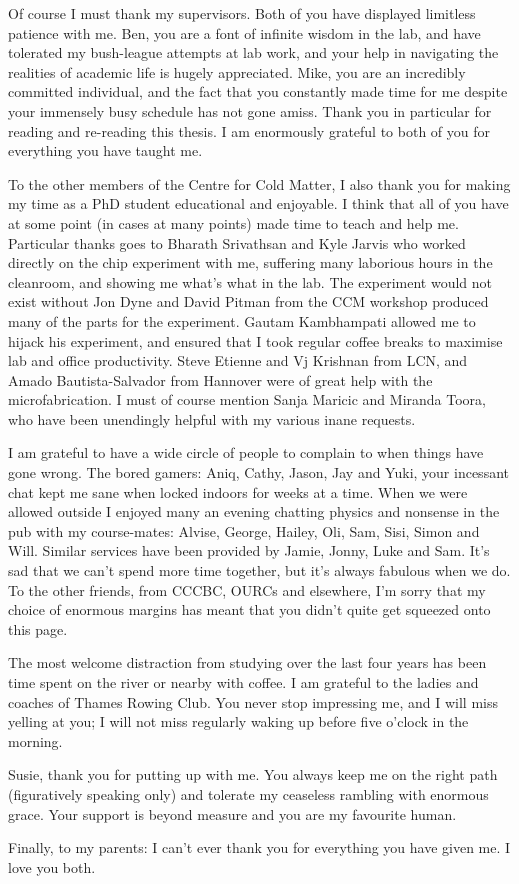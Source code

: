\begin{singlespace}
Of course I must thank my supervisors. Both of you have displayed limitless
patience with me. Ben, you are a font of infinite wisdom in the lab, and have
tolerated my bush-league attempts at lab work, and your help in navigating the
realities of academic life is hugely appreciated. Mike, you are an incredibly
committed individual, and the fact that you constantly made time for me despite
your immensely busy schedule has not gone amiss. Thank you in particular for
reading and re-reading this thesis.  I am enormously grateful to both of you
for everything you have taught me.

To the other members of the Centre for Cold Matter, I also thank you for making
my time as a PhD student educational and enjoyable. I think that all of you
have at some point (in cases at many points) made time to teach and
help me.
%
Particular thanks goes to Bharath Srivathsan and Kyle Jarvis who worked
directly on the chip experiment with me, suffering many laborious hours in the
cleanroom, and showing me what's what in the lab.
%
The experiment would not exist without Jon Dyne and David Pitman from the CCM
workshop produced many of the parts for the experiment.
%
Gautam Kambhampati allowed me to hijack his experiment, and ensured that I took
regular coffee breaks to maximise lab and office productivity.
%
Steve Etienne and Vj Krishnan from LCN, and Amado Bautista-Salvador from
Hannover were of great help with the microfabrication.
%
I must of course mention Sanja Maricic and Miranda Toora, who have been
unendingly helpful with my various inane requests.

I am grateful to have a wide circle of people to complain to when things have
gone wrong. The bored gamers: Aniq, Cathy, Jason, Jay and Yuki, your
incessant chat kept me sane when locked indoors for weeks at a time. When we
were allowed outside I enjoyed many an evening chatting physics and
nonsense in the pub with my course-mates:
Alvise, George, Hailey, Oli, Sam, Sisi, Simon and Will. 
%
Similar services have been provided by Jamie, Jonny, Luke and Sam. It's sad
that we can't spend more time together, but it's always fabulous when we do. To
the other friends, from CCCBC, OURCs and elsewhere, I'm sorry that my choice of
enormous margins has meant that you didn't quite get squeezed onto this page.

The most welcome distraction from studying over the last four years has been
time spent on the river or nearby with coffee. I am grateful to the ladies and
coaches of Thames Rowing Club. You never stop impressing me, and I will miss
yelling at you; I will not miss regularly waking up before five o'clock in the
morning.

Susie, thank you for putting up with me. You always keep me on the right path
(figuratively speaking only) and tolerate my ceaseless rambling with enormous
grace. Your support is beyond measure and you are my favourite human.

Finally, to my parents: I can't ever thank you for everything you have given
me. I love you both.

\end{singlespace}
